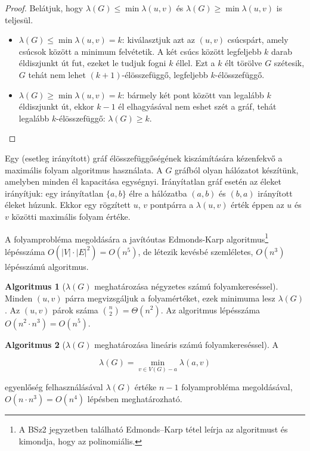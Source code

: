 \documentclass{article}
\theoremstyle{definition}
\newtheorem*{algoritmus}{Algoritmus}
\begin{document}
\begin{proof} Belátjuk, hogy $\lambda(G) \leq \min \lambda(u, v)$ és $\lambda(G) \geq \min \lambda(u, v)$ is teljesül. 
\begin{itemize}
  \item $\lambda(G) \leq \min \lambda(u, v) = k$: kiválasztjuk azt az $(u, v)$ csúcspárt, amely csúcsok között a minimum felvétetik. A két csúcs között legfeljebb $k$ darab éldiszjunkt út fut, ezeket le tudjuk fogni $k$ éllel. Ezt a $k$ élt törölve $G$ szétesik, $G$ tehát nem lehet $(k+1)$-élösszefüggő, legfeljebb $k$-élösszefüggő.
  
  
  \item $\lambda(G) \geq \min \lambda(u, v) = k$: bármely két pont között van legalább $k$ éldiszjunkt út, ekkor $k-1$ él elhagyásával nem eshet szét a gráf, tehát legalább $k$-élösszefüggő: $\lambda(G) \geq k$.
\end{itemize}
\end{proof}

Egy (esetleg irányított) gráf élösszefüggőségének kiszámítására kézenfekvő a maximális folyam algoritmus használata. A $G$ gráfból olyan hálózatot készítünk, amelyben minden él kapacitása egységnyi. Irányítatlan gráf esetén az éleket irányítjuk: egy irányítatlan $\{a,b\}$ élre a hálózatba $(a,b)$ és $(b,a)$ irányított éleket húzunk. 
Ekkor egy rögzített $u$, $v$ pontpárra a $\lambda(u, v)$ érték éppen az $u$ és $v$ közötti maximális folyam értéke.

A folyamprobléma megoldására a javítóutas Edmonds-Karp algoritmus\footnote{A BSz2 jegyzetben található Edmonds--Karp tétel leírja az algoritmust és kimondja, hogy az polinomiális.} lépésszáma $O(|V| \cdot |E|^2) = O(n^5)$, de létezik kevésbé szemléletes, $O(n^3)$ lépésszámú algoritmus.

\begin{algoritmus}[$\lambda(G)$ meghatározása négyzetes számú folyamkereséssel]
Minden $(u, v)$ párra megvizsgáljuk a folyamértéket, ezek minimuma lesz $\lambda(G)$. Az $(u, v)$ párok száma ${n \choose 2} = \Theta(n^2)$. Az algoritmus lépésszáma $O(n^2 \cdot n^3) = O(n^5)$.
\end{algoritmus}

\begin{algoritmus}[$\lambda(G)$ meghatározása lineáris számú folyamkereséssel] A 

\[ \lambda(G) = \min_{v \in V(G)-a} \lambda(a, v) \]

egyenlőség felhasználásával $\lambda(G)$ értéke $n-1$ folyamprobléma megoldásával, $O(n \cdot n^3) = O(n^4)$ lépésben meghatározható.
\end{algoritmus}
\end{document}
